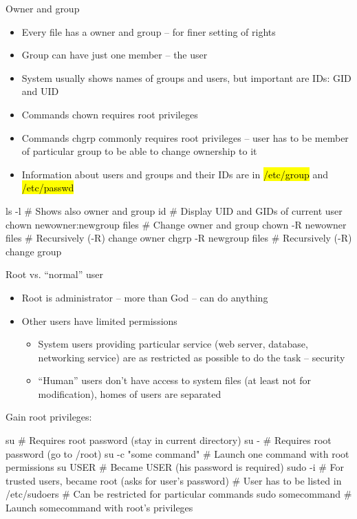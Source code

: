 \documentclass[compress, ucs, xelatex, 11pt, xcolor=svgnames,
  hyperref={
    bookmarks=true,
    unicode=true,
    colorlinks=true,
    pdftitle={Linux, command line and MetaCentrum},
    plainpages=false,
    pdfauthor={Vojtech Zeisek},
    pdfsubject={Course about use of Linux command line, writing shell scripts and using MetaCentrum of CESNET},
    pdfcreator={XeLaTeX},
    pdfkeywords={Linux, GNU, BASH, shell, command line, MetaCentrum},
    linkcolor=Red,
    anchorcolor=Blue,
    citecolor=Purple,
    filecolor=DodgerBlue,
    menucolor=DarkOrchid,
    urlcolor=DeepSkyBlue,
    pdftex},
  url={hyphens, lowtilde} %
  ]{beamer}
\renewcommand{\texttt}[1]{\hl{\ttfamily #1}}
\begin{document}
\begin{frame}[fragile]{Owner and group}
\begin{itemize}
  \item Every file has a owner and group -- for finer setting of rights
  \item Group can have just one member -- the user
  \item System usually shows names of groups and users, but important are IDs: GID and UID
  \item Commands chown requires root privileges
  \item Commands chgrp commonly requires root privileges -- user has to be member of particular group to be able to change ownership to it
  \item Information about users and groups and their IDs are in \texttt{/etc/group} and \texttt{/etc/passwd}
\end{itemize}
  \begin{bashcode}
    ls -l # Shows also owner and group
    id # Display UID and GIDs of current user
    chown newowner:newgroup files # Change owner and group
    chown -R newowner files # Recursively (-R) change owner
    chgrp -R newgroup files # Recursively (-R) change group
  \end{bashcode}
\end{frame}

\begin{frame}[fragile]{Root vs. ``normal'' user}
\begin{itemize}
  \item Root is administrator -- more than God -- can do anything
  \item Other users have limited permissions
  \begin{itemize}
    \item System users providing particular service (web server, database, networking service) are as restricted as possible to do the task -- security
    \item ``Human'' users don't have access to system files (at least not for modification), homes of users are separated
  \end{itemize}
\end{itemize}
Gain root privileges:
  \begin{bashcode}
    su # Requires root password (stay in current directory)
    su - # Requires root password (go to /root)
    su -c "some command" # Launch one command with root permissions
    su USER # Became USER (his password is required)
    sudo -i # For trusted users, became root (asks for user's password)
            # User has to be listed in /etc/sudoers
            # Can be restricted for particular commands
    sudo somecommand # Launch somecommand with root's privileges
  \end{bashcode}
\end{frame}
\end{document}
